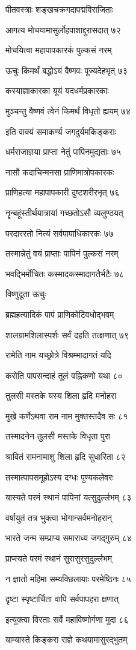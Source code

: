 पीतवस्त्राः शङ्खचक्रगदापद्मविराजिताः

आगत्य मोचयामासुर्लोहपाशाद्दुरासदात् ७२

मोचयित्वा महापापकारकं पुल्कसं नरम्

ऊचुः किमर्थं बद्धोऽयं वैष्णवः पूज्यदेहभृत् ७३

कस्याज्ञाकारका यूयं यदधर्मप्रकारकाः

मुञ्चन्तु वैष्णवं त्वेनं किमर्थं विधृतो ह्ययम् ७४

इति वाक्यं समाकर्ण्य जगदुर्यमकिङ्कराः

धर्मराजाज्ञया प्राप्ता नेतुं पापिनमुद्यताः ७५

नासौ कदाचिन्मनसा प्राणिमात्रोपकारकः

प्राणिहत्या महापापकारी दुष्टशरीरभृत् ७६

नॄन्बहूंस्तीर्थयात्रायां गच्छतोऽसौ व्यलुण्ठयत्

परदाररतो नित्यं सर्वपापाधिकारकः ७७

तस्मान्नेतुं वयं प्राप्ताः पापिनं पुल्कसं नरम्

भवद्भिर्मोचितः कस्मादकस्मादागतैर्भटैः ७८

विष्णुदूता ऊचुः

ब्रह्महत्यादिकं पापं प्राणिकोटिवधोद्भवम्

शालग्रामशिलास्पर्शः सर्वं दहति तत्क्षणात् ७९

रामेति नाम यच्छ्रोत्रे विश्रम्भादागतं यदि

करोति पापसन्दाहं तूलं वह्निकणो यथा ८०

तुलसी मस्तके यस्य शिला हृदि मनोहरा

मुखे कर्णेऽथवा राम नाम मुक्तस्तदैव सः ८१

तस्मादनेन तुलसी मस्तके विधृता पुरा

श्रावितं रामनामाशु शिला हृदि सुधारिता ८२

तस्मात्पापसमूहोऽस्य दग्धः पुण्यकलेवरः

यास्यते परमं स्थानं पापिनां यत्सुदुर्ल्लभम् ८३

वर्षायुतं तत्र भुक्त्वा भोगान्सर्वमनोहरान्

भारते जन्म सम्प्राप्य समाराध्य जगद्गुरुम् ८४

प्राप्स्यते परमं स्थानं सुरासुरसुदुर्ल्लभम्

न ज्ञातो महिमा सम्यक्छिलायाः परमेष्ठिनः ८५

दृष्टा स्पृष्टार्चिता वापि सर्वपापहरा क्षणात्

इत्युक्त्वा विरताः सर्वे महाविष्णोर्गणा मुदा ८६

याम्यास्ते किङ्करा राज्ञे कथयामासुरद्भुतम्

